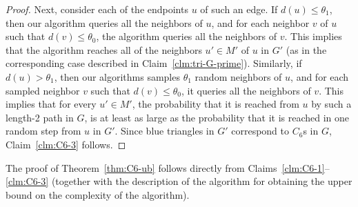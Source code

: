 \begin{proof}
Next, consider each of the endpoints $u$ of such an edge. If $d(u)\leq \theta_1$, then our algorithm queries all the neighbors of $u$, and for each neighbor $v$ of $u$ such that $d(v) \leq \theta_0$, the algorithm queries all the neighbors of $v$. This implies that  the algorithm reaches all of the  neighbors $u'\in M'$ of $u$ in $G'$ (as in the corresponding case described in Claim~\ref{clm:tri-G-prime}). Similarly, if $d(u)> \theta_1$, then our algorithms samples $\theta_1$ random neighbors of $u$, and for each sampled neighbor $v$ such that $d(v) \leq \theta_0$, it queries all the neighbors of $v$. This implies that for every $u'\in M'$, the probability that it is reached from $u$ by such a length-2 path in $G$, is at least as large as the probability that it is reached in one random step from $u$ in $G'$.
Since blue triangles in $G'$ correspond to $C_6$s in $G$, Claim~\ref{clm:C6-3} follows.
\end{proof}

\medskip
The proof of Theorem~\ref{thm:C6-ub} follows directly from Claims~\ref{clm:C6-1}--\ref{clm:C6-3} (together with the description of the algorithm for obtaining the upper bound on the complexity of the algorithm).

